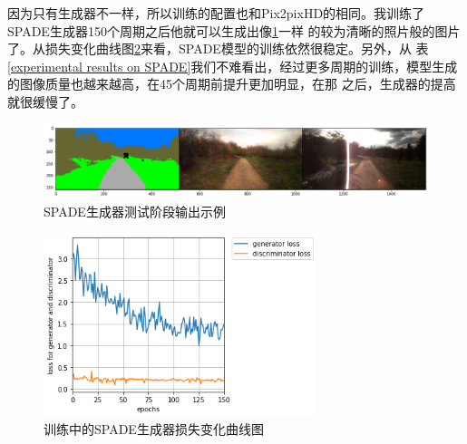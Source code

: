 \documentclass[supercite]{HustGraduPaper}
\theoremstyle{definition}
\begin{document}
因为只有生成器不一样，所以训练的配置也和Pix2pixHD的相同。我训练了SPADE生成器150个周期之后他就可以生成出像\ref{fig:SPADE-output}一样
的较为清晰的照片般的图片了。从损失变化曲线图\ref{fig:SPADE-loss}来看，SPADE模型的训练依然很稳定。另外，从
表\ref{experimental results on SPADE}我们不难看出，经过更多周期的训练，模型生成的图像质量也越来越高，在45个周期前提升更加明显，在那
之后，生成器的提高就很缓慢了。
\begin{figure}
  \begin{center}
  \includegraphics[width=14cm]{images/SPADE-output}
  \end{center}
  \caption{SPADE生成器测试阶段输出示例}
  \label{fig:SPADE-output}
\end{figure}
\begin{figure}
  \begin{center}
  \includegraphics[width=8cm]{images/SPADE-loss}
  \end{center}
  \caption{训练中的SPADE生成器损失变化曲线图}
  \label{fig:SPADE-loss}
\end{figure}
\end{document}

